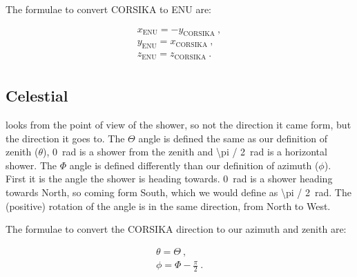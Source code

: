 The formulae to convert CORSIKA to ENU are:

\begin{equation}
    \begin{array}{l}
        x_{\mathrm{ENU}} = -y_{\mathrm{CORSIKA}} \ , \\
        y_{\mathrm{ENU}} = x_{\mathrm{CORSIKA}} \ , \\
        z_{\mathrm{ENU}} = z_{\mathrm{CORSIKA}} \ . \\
    \end{array}
\end{equation}


\subsection{Celestial}

\corsika looks from the point of view of the shower, so not the
direction it came form, but the direction it goes to. The $\Theta$ angle
is defined the same as our definition of zenith ($\theta$),
\SI{0}{\radian} is a shower from the zenith and \SI{\pi / 2}{\radian} is
a horizontal shower. The $\Phi$ angle is defined differently than our
definition of azimuth ($\phi$). First it is the angle the shower is heading
towards. \SI{0}{\radian} is a shower heading towards North, so coming
form South, which we would define as \SI{\pi / 2}{\radian}. The
(positive) rotation of the angle is in the same direction, from North to
West.

The formulae to convert the CORSIKA direction to our azimuth and zenith are:

\begin{equation}
    \begin{array}{l}
        \theta = \Theta \ , \\
        \phi = \Phi - \frac{\pi}{2} \ . \\
    \end{array}
\end{equation}


\printbibliography
